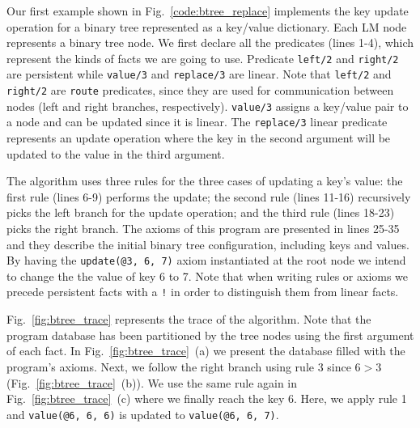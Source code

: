 Our first example shown in Fig.~\ref{code:btree_replace} implements the key update operation for a binary tree
represented as a key/value dictionary. Each LM node represents a binary tree node.
We first declare all the predicates (lines 1-4), which represent the kinds of facts we are going to use.
Predicate \texttt{left/2} and \texttt{right/2} are persistent while \texttt{value/3} and \texttt{replace/3} are linear.
Note that \texttt{left/2} and \texttt{right/2} are \texttt{route} predicates, since they are used for communication
between nodes (left and right branches, respectively). \texttt{value/3} assigns a key/value pair to a node and can
be updated since it is linear. The \texttt{replace/3} linear predicate represents an update operation where the key in
the second argument will be updated to the value in the third argument.

The algorithm uses three rules for the three cases of updating a key's value: the first rule (lines 6-9) performs the update;
the second rule (lines 11-16) recursively picks the left branch for the update operation; and the third rule (lines 18-23) picks the right branch.
The axioms of this program are presented in lines 25-35 and they describe the initial binary tree configuration, including keys and values.
By having the \texttt{update(@3, 6, 7)} axiom instantiated at the root node we intend to change the the value of key 6 to 7.
Note that when writing rules or axioms we precede persistent facts with a \texttt{!} in order to distinguish them from linear facts.

Fig.~\ref{fig:btree_trace} represents the trace of the algorithm. Note that the program database has been partitioned
by the tree nodes using the first argument of each fact. In Fig.~\ref{fig:btree_trace}~(a) we present the database
filled with the program's axioms. Next, we follow the right branch using rule 3 since $6 > 3$ (Fig.~\ref{fig:btree_trace}~(b)).
We use the same rule again in Fig.~\ref{fig:btree_trace}~(c) where we finally reach the key 6. Here, we apply rule 1 and
\texttt{value(@6, 6, 6)} is updated to \texttt{value(@6, 6, 7)}.

